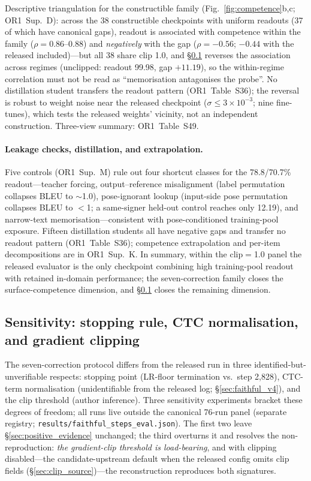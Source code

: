\documentclass[pdflatex,sn-chicago]{sn-jnl}
\begin{document}
\medskip
\noindent\label{sec:insample}Descriptive triangulation for the constructible family (Fig.~\ref{fig:competence}b,c; OR1~Sup.~D): across the 38 constructible checkpoints with uniform readouts (37 of which have canonical gaps), readout is associated with competence within the family ($\rho{=}0.86$--$0.88$) and \emph{negatively} with the gap ($\rho{=}{-}0.56$; $-0.44$ with the released included)---but all 38 share clip 1.0, and \S\ref{sec:sensitivity} reverses the association across regimes (unclipped: readout 99.98, gap $+11.19$), so the within-regime correlation must not be read as ``memorisation antagonises the probe''. No distillation student transfers the readout pattern (OR1~Table~S36); the reversal is robust to weight noise near the released checkpoint ($\sigma\leq3\times10^{-3}$; nine fine-tunes), which tests the released weights' vicinity, not an independent construction. Three-view summary: OR1~Table~S49.

\paragraph{Leakage checks, distillation, and extrapolation.}
\label{sec:leakage_checks}
Five controls (OR1~Sup.~M) rule out four shortcut classes for the 78.8/70.7\% readout---teacher forcing, output--reference misalignment (label permutation collapses BLEU to $\sim$1.0), pose-ignorant lookup (input-side pose permutation collapses BLEU to $<$1; a same-signer held-out control reaches only 12.19), and narrow-text memorisation---consistent with pose-conditioned training-pool exposure. Fifteen distillation students all have negative gaps and transfer no readout pattern (OR1~Table~S36); competence extrapolation and per-item decompositions are in OR1~Sup.~K. In summary, within the clip$=$1.0 panel the released evaluator is the only checkpoint combining high training-pool readout with retained in-domain performance; the seven-correction family closes the surface-competence dimension, and \S\ref{sec:sensitivity} closes the remaining dimension.



\subsection{Sensitivity: stopping rule, CTC normalisation, and gradient clipping}
\label{sec:sensitivity}
The seven-correction protocol differs from the released run in three identified-but-unverifiable respects: stopping point (LR-floor termination vs.\ step 2{,}828), CTC-term normalisation (unidentifiable from the released log; \S\ref{sec:faithful_v4}), and the clip threshold (author inference). Three sensitivity experiments bracket these degrees of freedom; all runs live outside the canonical 76-run panel (separate registry; \texttt{results/faithful\_steps\_eval.json}). The first two leave \S\ref{sec:positive_evidence} unchanged; the third overturns it and resolves the non-reproduction: \emph{the gradient-clip threshold is load-bearing}, and with clipping disabled---the candidate-upstream default when the released config omits clip fields (\S\ref{sec:clip_source})---the reconstruction reproduces both signatures.
\end{document}
